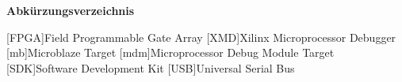 
{\textbf{Abkürzungsverzeichnis}}

\begin{acronym}[Bash]
 [FPGA]{Field Programmable Gate Array}
 [XMD]{Xilinx Microprocessor Debugger}
 [mb]{Microblaze Target}
 [mdm]{Microprocessor Debug Module Target}
 [SDK]{Software Development Kit}
 [USB]{Universal Serial Bus}
\end{acronym}
